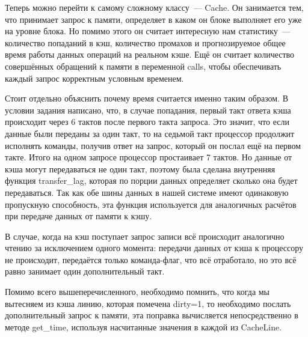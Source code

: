 \documentclass[14pt, russian, onesize]{extreport}
\begin{document}
Теперь можно перейти к самому сложному классу~--- Cache. Он
занимается тем, что принимает запрос к памяти, определяет
в каком он блоке выполняет его уже на уровне блока. Но помимо
этого он считает интересную нам статистику~--- количество
попаданий в кэш, количество промахов и прогнозируемое общее
время работы данных операций на реальном кэше. Ещё он
считает количество совершённых обращений к памяти в
переменной calls, чтобы 
обеспечивать каждый запрос корректным условным временем.

Стоит отдельно объяснить почему время считается именно таким образом.
В условии задания написано, что, в случае попадания,
первый такт ответа кэша происходит
через 6 тактов после первого такта запроса. Это значит, что 
если данные были переданы за один такт, то на седьмой
такт процессор продолжит исполнять команды, получив ответ
на запрос, который он послал ещё на первом такте. Итого на
одном запросе процессор простаивает 7 тактов. Но данные
от кэша могут передаваться не один такт, поэтому была
сделана внутренняя функция transfer\_lag, которая по порции
данных определяет сколько она будет передаваться.
Так как обе шины данных в нашей системе имеют одинаковую
пропускную способность, эта функция используется для 
аналогичных расчётов при передаче данных от 
памяти к кэшу. 

В случае, когда на кэш поступает запрос записи всё происходит
аналогично чтению за исключением одного момента:
передачи данных от кэша к процессору не происходит,
передаётся только команда-флаг, что всё отработало,
но это всё равно занимает один дополнительный такт.

Помимо всего вышеперечисленного, необходимо помнить, что
когда мы вытесняем из кэша линию, которая помечена dirty=1,
то необходимо послать дополнительный запрос к памяти, эта
поправка вычисляется непосредственно в методе 
get\_time, используя насчитанные значения в каждой из CacheLine.
\end{document}

